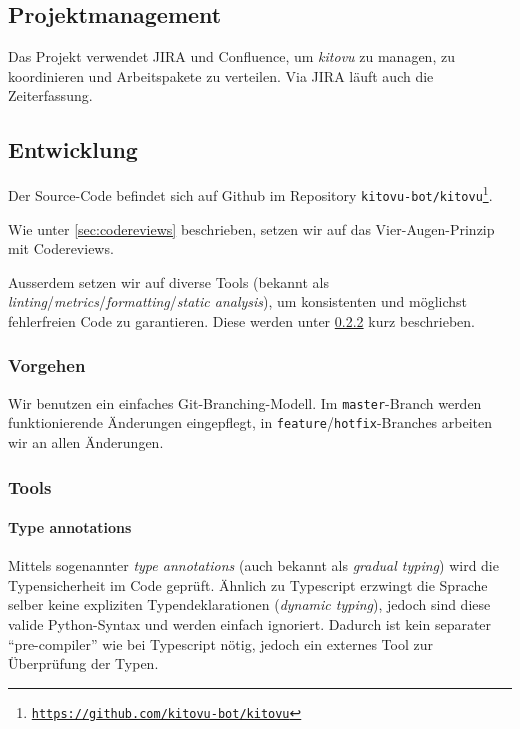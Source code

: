\documentclass[a4paper]{article}
\begin{document}
\subsection{Projektmanagement}
Das Projekt verwendet JIRA und Confluence, um \emph{kitovu} zu managen, zu koordinieren und Arbeitspakete zu verteilen. Via JIRA läuft auch die Zeiterfassung.

\subsection{Entwicklung}

Der Source-Code befindet sich auf Github im Repository \texttt{kitovu-bot/kitovu\footnote{\url{https://github.com/kitovu-bot/kitovu}}}.

Wie unter \ref{sec:codereviews} beschrieben, setzen wir auf das
Vier-Augen-Prinzip mit Codereviews.

Ausserdem setzen wir auf diverse Tools (bekannt als
\emph{linting}/\emph{metrics}/\emph{formatting}/\emph{static analysis}), um konsistenten und möglichst
fehlerfreien Code zu garantieren. Diese werden unter \ref{sec:tools} kurz beschrieben.

\subsubsection{Vorgehen}
Wir benutzen ein einfaches Git-Branching-Modell. Im \verb|master|-Branch
werden funktionierende Än\-de\-rung\-en eingepflegt, in \verb|feature|/\verb|hotfix|-Branches arbeiten wir an allen Änderungen.

\subsubsection{Tools}
\label{sec:tools}

\paragraph{Type annotations} Mittels sogenannter \emph{type annotations} (auch bekannt als \emph{gradual typing}) wird die Typensicherheit im Code geprüft. Ähnlich zu Typescript erzwingt die Sprache selber keine expliziten
Typendeklarationen (\emph{dynamic typing}), jedoch sind diese valide Python-Syntax und werden einfach ignoriert. Dadurch ist kein separater ``pre-compiler'' wie bei Typescript nötig, jedoch ein externes Tool zur Überprüfung der Typen.
\end{document}
